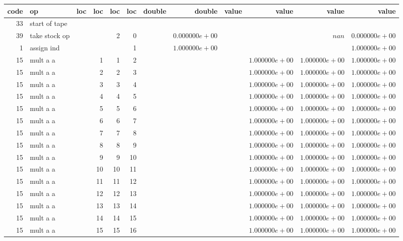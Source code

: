\documentclass{article}
\begin{document}
\tiny
\begin{tabular}{|r|l|r|r|r|r||r|r||r|r|r|r|} \hline 
 code & op & loc & loc & loc & loc & double & double & value & value & value & value \\ \hline 
 33 & start of tape & & & & & & & & & &  \\ \hline 
39 & take stock op & & & 2 & 0 & &$ 0.000000e+00 $& & &$ nan $&$ 0.000000e+00 $\\ \hline 
1 & assign ind & & & & 1 & &$ 1.000000e+00 $& & & &$ 1.000000e+00 $\\ \hline 
15 & mult a a & & 1 & 1 & 2 & & & &$ 1.000000e+00 $&$ 1.000000e+00 $&$ 1.000000e+00 $\\ \hline 
15 & mult a a & & 2 & 2 & 3 & & & &$ 1.000000e+00 $&$ 1.000000e+00 $&$ 1.000000e+00 $\\ \hline 
15 & mult a a & & 3 & 3 & 4 & & & &$ 1.000000e+00 $&$ 1.000000e+00 $&$ 1.000000e+00 $\\ \hline 
15 & mult a a & & 4 & 4 & 5 & & & &$ 1.000000e+00 $&$ 1.000000e+00 $&$ 1.000000e+00 $\\ \hline 
15 & mult a a & & 5 & 5 & 6 & & & &$ 1.000000e+00 $&$ 1.000000e+00 $&$ 1.000000e+00 $\\ \hline 
15 & mult a a & & 6 & 6 & 7 & & & &$ 1.000000e+00 $&$ 1.000000e+00 $&$ 1.000000e+00 $\\ \hline 
15 & mult a a & & 7 & 7 & 8 & & & &$ 1.000000e+00 $&$ 1.000000e+00 $&$ 1.000000e+00 $\\ \hline 
15 & mult a a & & 8 & 8 & 9 & & & &$ 1.000000e+00 $&$ 1.000000e+00 $&$ 1.000000e+00 $\\ \hline 
15 & mult a a & & 9 & 9 & 10 & & & &$ 1.000000e+00 $&$ 1.000000e+00 $&$ 1.000000e+00 $\\ \hline 
15 & mult a a & & 10 & 10 & 11 & & & &$ 1.000000e+00 $&$ 1.000000e+00 $&$ 1.000000e+00 $\\ \hline 
15 & mult a a & & 11 & 11 & 12 & & & &$ 1.000000e+00 $&$ 1.000000e+00 $&$ 1.000000e+00 $\\ \hline 
15 & mult a a & & 12 & 12 & 13 & & & &$ 1.000000e+00 $&$ 1.000000e+00 $&$ 1.000000e+00 $\\ \hline 
15 & mult a a & & 13 & 13 & 14 & & & &$ 1.000000e+00 $&$ 1.000000e+00 $&$ 1.000000e+00 $\\ \hline 
15 & mult a a & & 14 & 14 & 15 & & & &$ 1.000000e+00 $&$ 1.000000e+00 $&$ 1.000000e+00 $\\ \hline 
15 & mult a a & & 15 & 15 & 16 & & & &$ 1.000000e+00 $&$ 1.000000e+00 $&$ 1.000000e+00 $\\ \hline 

\end{tabular}
\end{document}
